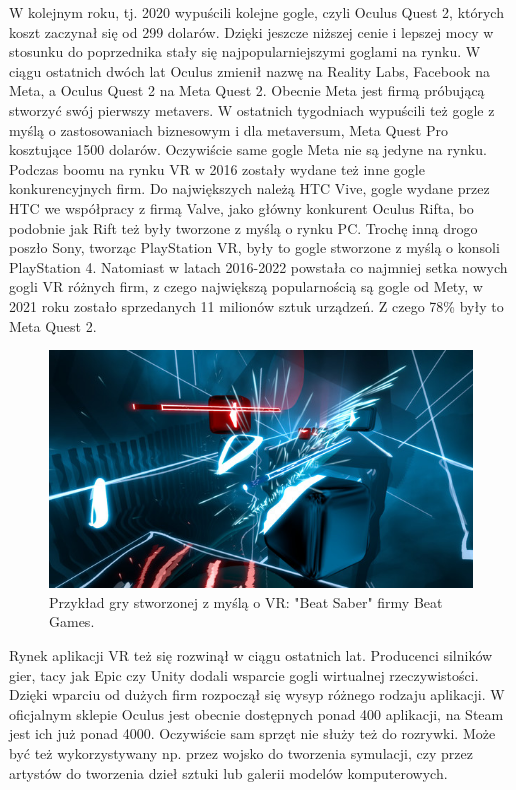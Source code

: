 \documentclass[a4paper,12pt,reqno]{article}
\begin{document}
W kolejnym roku, tj. 2020 wypuścili kolejne gogle, czyli Oculus Quest 2, których koszt zaczynał się od 299 dolarów. Dzięki jeszcze niższej cenie i lepszej mocy w stosunku do poprzednika stały się najpopularniejszymi goglami na rynku. W ciągu ostatnich dwóch lat Oculus zmienił nazwę na Reality Labs, Facebook na Meta, a Oculus Quest 2 na Meta Quest 2. Obecnie Meta jest firmą próbującą stworzyć swój pierwszy metavers. W ostatnich tygodniach wypuścili też gogle z myślą o zastosowaniach biznesowym i dla metaversum, Meta Quest Pro kosztujące 1500 dolarów. Oczywiście same gogle Meta nie są jedyne na rynku. Podczas boomu na rynku VR w 2016 zostały wydane też inne gogle konkurencyjnych firm. Do największych należą HTC Vive, gogle wydane przez HTC we współpracy z firmą Valve, jako główny konkurent Oculus Rifta, bo podobnie jak Rift też były tworzone z myślą o rynku PC. Trochę inną drogo poszło Sony, tworząc PlayStation VR, były to gogle stworzone z myślą o konsoli PlayStation 4. Natomiast w latach 2016-2022 powstała co najmniej setka nowych gogli VR różnych firm\cite{ilosc_urzadzen}, z czego największą popularnością są gogle od Mety\cite{popularnosc_gogli}, w 2021 roku zostało sprzedanych 11 milionów sztuk urządzeń. Z czego 78\% były to Meta Quest 2\cite{ilosc_urzadzen}.

\begin{figure}[!ht]%
\centering
\includegraphics[width=0.8\columnwidth]{graphics/BeatSaber.jpg}
\caption{Przykład gry stworzonej z myślą o VR: "Beat Saber" firmy Beat Games.
\label{OpenBrush}}%
%
\qquad
\end{figure}  


Rynek aplikacji VR też się rozwinął w ciągu ostatnich lat. Producenci silników gier, tacy jak Epic czy Unity dodali wsparcie gogli wirtualnej rzeczywistości. Dzięki wparciu od dużych firm rozpoczął się wysyp różnego rodzaju aplikacji. W oficjalnym sklepie Oculus jest obecnie dostępnych ponad 400 aplikacji\cite{liczba_gier_quest}, na Steam jest ich już ponad 4000\cite{liczba_gier_steam}. Oczywiście sam sprzęt nie służy też do rozrywki. Może być też wykorzystywany np. przez wojsko do tworzenia symulacji, czy przez artystów do tworzenia dzieł sztuki lub galerii modelów komputerowych.
\end{document}
